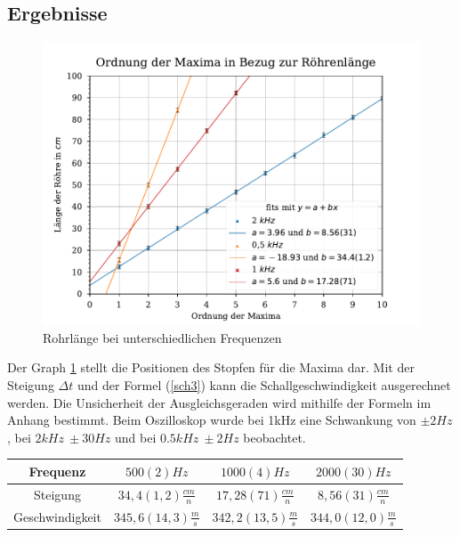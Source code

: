 \documentclass[11pt, a4paper]{article}
\begin{document}
    \subsection{Ergebnisse}
    \begin{figure}[h]
        \begin{center}
            \includegraphics[width=120mm]{./Test.pdf}
        \end{center}
        

        \caption{Rohrlänge bei unterschiedlichen Frequenzen}
        \label{fig:graph3}
    \end{figure}
    Der Graph \ref{fig:graph3} stellt die Positionen des Stopfen für die Maxima dar. Mit der Steigung $\Delta t$ und der Formel (\ref{sch3}) kann die Schallgeschwindigkeit
    ausgerechnet werden. Die Unsicherheit der Ausgleichsgeraden wird mithilfe der Formeln im Anhang bestimmt.
    Beim Oszilloskop wurde bei 1kHz eine Schwankung von $\pm 2Hz$, bei $ 2kHz \ \pm 30Hz$ und bei $0.5kHz \ \pm 2Hz $ beobachtet.
  

    \begin{table}
        \centering
        \begin{tabular}[]{c|c|c|c}
            Frequenz & $500(2)Hz$ & $1000(4)Hz$ & $2000(30)Hz$ \\ \hline
            Steigung &  $ 34,4(1,2) \frac{cm}{n}$ & $17,28(71)\frac{cm}{n}$ & $8,56(31)\frac{cm}{n}$ \\ \hline
            Geschwindigkeit & $345,6(14,3) \frac{m}{s}$ & $342,2(13,5) \frac{m}{s}$ & $344,0(12,0)\frac{m}{s}$ 
        \end{tabular}
    \end{table}
\end{document}
